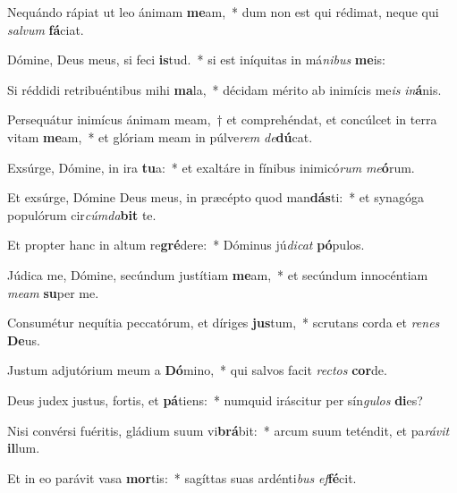 \item Nequándo rápiat ut leo ánimam \textbf{me}am,~* dum non est qui rédimat, neque qui \textit{sal}\textit{vum} \textbf{fá}ciat.

\item Dómine, Deus meus, si feci \textbf{is}tud.~* si est iníquitas in má\textit{ni}\textit{bus} \textbf{me}is:

\item Si réddidi retribuéntibus mihi \textbf{ma}la,~* décidam mérito ab inimícis me\textit{is} \textit{in}\textbf{á}nis.

\item Persequátur inimícus ánimam meam,~† et comprehéndat, et concúlcet in terra vitam \textbf{me}am,~* et glóriam meam in púlve\textit{rem} \textit{de}\textbf{dú}cat.

\item Exsúrge, Dómine, in ira \textbf{tu}a:~* et exaltáre in fínibus inimicó\textit{rum} \textit{me}\textbf{ó}rum.

\item Et exsúrge, Dómine Deus meus, in præcépto quod man\textbf{dás}ti:~* et synagóga populórum cir\textit{cúm}\textit{da}\textbf{bit} te.

\item Et propter hanc in altum re\textbf{gré}dere:~* Dóminus jú\textit{di}\textit{cat} \textbf{pó}pulos.

\item Júdica me, Dómine, secúndum justítiam \textbf{me}am,~* et secúndum innocéntiam \textit{me}\textit{am} \textbf{su}per me.

\item Consumétur nequítia peccatórum, et díriges \textbf{jus}tum,~* scrutans corda et \textit{re}\textit{nes} \textbf{De}us.

\item Justum adjutórium meum a \textbf{Dó}mino,~* qui salvos facit \textit{rec}\textit{tos} \textbf{cor}de.

\item Deus judex justus, fortis, et \textbf{pá}tiens:~* numquid iráscitur per sín\textit{gu}\textit{los} \textbf{di}es?

\item Nisi convérsi fuéritis, gládium suum vi\textbf{brá}bit:~* arcum suum teténdit, et pa\textit{rá}\textit{vit} \textbf{il}lum.

\item Et in eo parávit vasa \textbf{mor}tis:~* sagíttas suas ardénti\textit{bus} \textit{ef}\textbf{fé}cit.

